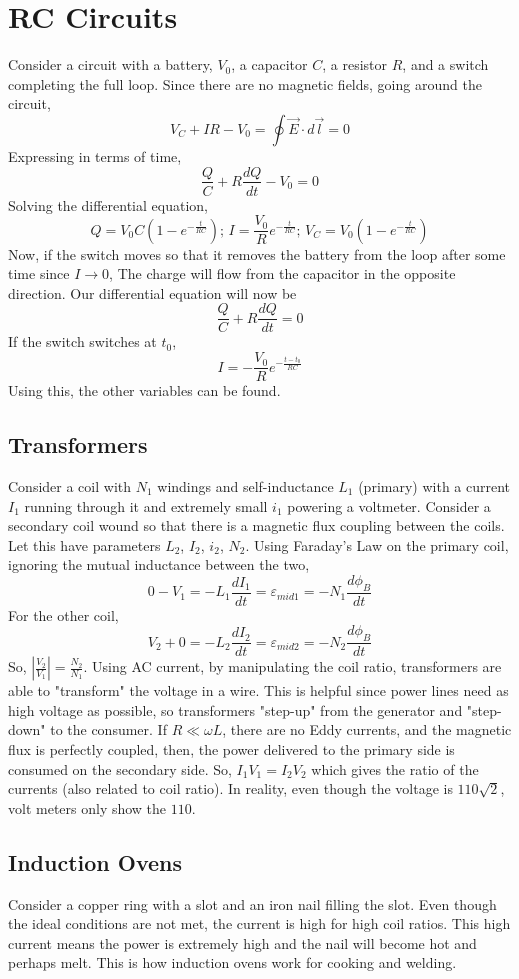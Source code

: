 \documentclass{article}
\begin{document}
\section{RC Circuits}
Consider a circuit with a battery, $V_{0}$, a capacitor $C$, a resistor $R$, and a switch completing the full loop. Since there are no magnetic fields,
going around the circuit,
$$V_{C}+IR-V_{0}=\oint \vec{E}\cdot d\vec{l}=0$$
Expressing in terms of time,
$$\frac{Q}{C}+R\frac{dQ}{dt}-V_{0}=0$$
Solving the differential equation,
$$Q=V_{0}C(1-e^{-\frac{t}{RC}});\, I=\frac{V_0}{R}e^{-\frac{t}{RC}};\,
V_{C}=V_{0}(1-e^{-\frac{t}{RC}})
$$
Now, if the switch moves so that it removes the battery from the loop after some time since $I\rightarrow 0$,
The charge will flow from the capacitor in the opposite direction. Our differential equation will now be
$$\frac{Q}{C}+R\frac{dQ}{dt}=0$$
If the switch switches at $t_{0}$,
$$I=-\frac{V_{0}}{R}e^{-\frac{t-t_{0}}{RC}}$$
Using this, the other variables can be found.

\subsection{Transformers}
Consider a coil with $N_{1}$ windings and self-inductance $L_{1}$ (primary) with a current $I_{1}$
running through it and extremely small $i_{1}$ powering a voltmeter. Consider a secondary coil wound 
so that there is a magnetic flux coupling between the coils. Let this have parameters $L_{2}$, $I_{2}$, $i_{2}$, $N_{2}$.
Using Faraday's Law on the primary coil, ignoring the mutual inductance between the two,
$$0-V_{1}=-L_{1}\frac{dI_{1}}{dt}=\varepsilon_{mid1}=-N_{1}\frac{d\phi_{B}}{dt}$$
For the other coil,
$$V_{2}+0=-L_{2}\frac{dI_{2}}{dt}=\varepsilon_{mid2}=-N_{2}\frac{d\phi_{B}}{dt}$$
So, $\left|\frac{V_{2}}{V_{1}}\right|=\frac{N_{2}}{N_{1}}$. Using AC current,
by manipulating the coil ratio, transformers are able to "transform" the voltage in a wire. This is helpful
since power lines need as high voltage as possible, so transformers "step-up" from the generator and "step-down"
to the consumer. If $R\ll \omega L$, there are no Eddy currents, and the magnetic flux is perfectly coupled,
then, the power delivered to the primary side is consumed on the secondary side. So, $I_{1}V_{1}=I_{2}V_{2}$ 
which gives the ratio of the currents (also related to coil ratio). In reality, even though the voltage is $110\sqrt{2}$,
volt meters only show the $110$.

\subsection{Induction Ovens}
Consider a copper ring with a slot and an iron nail filling the slot. Even though the ideal conditions are not met,
the current is high for high coil ratios. This high current means the power is extremely high and the nail will become 
hot and perhaps melt. This is how induction ovens work for cooking and welding.
\end{document}

